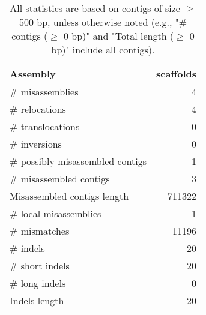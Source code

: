 \documentclass[12pt,a4paper]{article}
\begin{document}
\begin{table}[ht]
\begin{center}
\caption{All statistics are based on contigs of size $\geq$ 500 bp, unless otherwise noted (e.g., "\# contigs ($\geq$ 0 bp)" and "Total length ($\geq$ 0 bp)" include all contigs).}
\begin{tabular}{|l*{1}{|r}|}
\hline
Assembly & scaffolds \\ \hline
\# misassemblies & 4 \\ \hline
\hspace{5mm}\# relocations & 4 \\ \hline
\hspace{5mm}\# translocations & 0 \\ \hline
\hspace{5mm}\# inversions & 0 \\ \hline
\# possibly misassembled contigs & 1 \\ \hline
\# misassembled contigs & 3 \\ \hline
Misassembled contigs length & 711322 \\ \hline
\# local misassemblies & 1 \\ \hline
\# mismatches & 11196 \\ \hline
\# indels & 20 \\ \hline
\hspace{5mm}\# short indels & 20 \\ \hline
\hspace{5mm}\# long indels & 0 \\ \hline
Indels length & 20 \\ \hline
\end{tabular}
\end{center}
\end{table}
\end{document}
